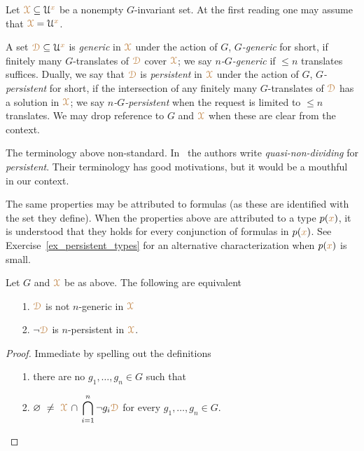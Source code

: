 Let ${\color{brown}\EuScript X}\subseteq\EuScript U^{\color{brown} x}$ be a nonempty $G$-invariant set.
At the first reading one may assume that ${\color{brown}\EuScript X}=\EuScript U^{\color{brown} x}$.

A set ${\color{brown}\EuScript D}\subseteq\EuScript U^{\color{brown} x}$ is \emph{generic\/} in ${\color{brown}\EuScript X}$ under the action of $G$, \emph{$G$-generic\/} for short, if finitely many $G$-translates of ${\color{brown}\EuScript D}$ cover ${\color{brown}\EuScript X}$; we say \emph{$n$-$G$-generic\/} if $\le n$ translates suffices.
Dually, we say that ${\color{brown}\EuScript D}$ is \emph{persistent\/} in ${\color{brown}\EuScript X}$ under the action of $G$, \emph{$G$-persistent\/} for short, if the intersection of any finitely many $G$-translates of ${\color{brown}\EuScript D}$ has a solution in ${\color{brown}\EuScript X}$; we say \emph{$n$-$G$-persistent\/} when the request is limited to $\le n$ translates.
We may drop reference to $G$ and ${\color{brown}\EuScript X}$ when these are clear from the context.

\noindent\llap{\textcolor{red}{\Large\warning}\kern1.5ex}\ignorespaces
The terminology above non-standard.
In~\cite{CK} the authors write \textit{quasi-non-dividing\/} for \textit{persistent}.
Their terminology has good motivations, but it would be a mouthful in our context.

The same properties may be attributed to formulas (as these are identified with the set they define).
When the properties above are attributed to a type $p({\color{brown} x})$, it is understood that they holds for every conjunction of formulas in $p({\color{brown} x})$.
See Exercise~\ref{ex_persistent_types} for an alternative characterization when $p({\color{brown} x})$ is small.

\begin{fact}\label{fact_fip}
  Let $G$ and ${\color{brown}\EuScript X}$ be as above.
  The following are equivalent
  \begin{itemize}
    \item[1.] ${\color{brown}\EuScript D}$ is not $n$-generic in ${\color{brown}\EuScript X}$
    \item[2.] $\neg{\color{brown}\EuScript D}$ is $n$-persistent in ${\color{brown}\EuScript X}$.
  \end{itemize}
\end{fact}

\begin{proof}
  Immediate by spelling out the definitions\smallskip
  \begin{itemize}
    \item[1.] there are no $g_1,\dots,g_n\in G$ such that 
    \item[2.]  $\displaystyle\0\ \neq\ \mrX\,\cap\,\bigcap_{i=1}^n\neg g_i{\mr\D}$ for every $g_1,\dots,g_n\in G$.\qedhere
  \end{itemize} 
\end{proof}

